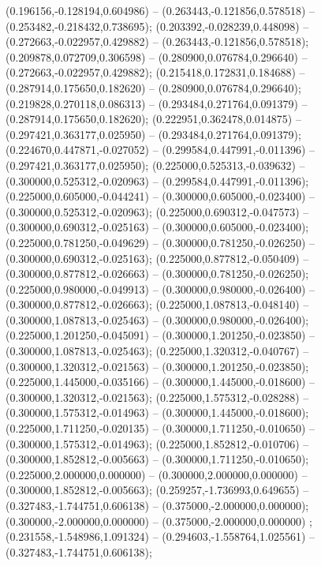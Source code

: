  (0.196156,-0.128194,0.604986) -- (0.263443,-0.121856,0.578518) -- (0.253482,-0.218432,0.738695);
 (0.203392,-0.028239,0.448098) -- (0.272663,-0.022957,0.429882) -- (0.263443,-0.121856,0.578518);
 (0.209878,0.072709,0.306598) -- (0.280900,0.076784,0.296640) -- (0.272663,-0.022957,0.429882);
 (0.215418,0.172831,0.184688) -- (0.287914,0.175650,0.182620) -- (0.280900,0.076784,0.296640);
 (0.219828,0.270118,0.086313) -- (0.293484,0.271764,0.091379) -- (0.287914,0.175650,0.182620);
 (0.222951,0.362478,0.014875) -- (0.297421,0.363177,0.025950) -- (0.293484,0.271764,0.091379);
 (0.224670,0.447871,-0.027052) -- (0.299584,0.447991,-0.011396) -- (0.297421,0.363177,0.025950);
 (0.225000,0.525313,-0.039632) -- (0.300000,0.525312,-0.020963) -- (0.299584,0.447991,-0.011396);
 (0.225000,0.605000,-0.044241) -- (0.300000,0.605000,-0.023400) -- (0.300000,0.525312,-0.020963);
 (0.225000,0.690312,-0.047573) -- (0.300000,0.690312,-0.025163) -- (0.300000,0.605000,-0.023400);
 (0.225000,0.781250,-0.049629) -- (0.300000,0.781250,-0.026250) -- (0.300000,0.690312,-0.025163);
 (0.225000,0.877812,-0.050409) -- (0.300000,0.877812,-0.026663) -- (0.300000,0.781250,-0.026250);
 (0.225000,0.980000,-0.049913) -- (0.300000,0.980000,-0.026400) -- (0.300000,0.877812,-0.026663);
 (0.225000,1.087813,-0.048140) -- (0.300000,1.087813,-0.025463) -- (0.300000,0.980000,-0.026400);
 (0.225000,1.201250,-0.045091) -- (0.300000,1.201250,-0.023850) -- (0.300000,1.087813,-0.025463);
 (0.225000,1.320312,-0.040767) -- (0.300000,1.320312,-0.021563) -- (0.300000,1.201250,-0.023850);
 (0.225000,1.445000,-0.035166) -- (0.300000,1.445000,-0.018600) -- (0.300000,1.320312,-0.021563);
 (0.225000,1.575312,-0.028288) -- (0.300000,1.575312,-0.014963) -- (0.300000,1.445000,-0.018600);
 (0.225000,1.711250,-0.020135) -- (0.300000,1.711250,-0.010650) -- (0.300000,1.575312,-0.014963);
 (0.225000,1.852812,-0.010706) -- (0.300000,1.852812,-0.005663) -- (0.300000,1.711250,-0.010650);
 (0.225000,2.000000,0.000000) -- (0.300000,2.000000,0.000000) -- (0.300000,1.852812,-0.005663);
 (0.259257,-1.736993,0.649655) -- (0.327483,-1.744751,0.606138) -- (0.375000,-2.000000,0.000000);
 (0.300000,-2.000000,0.000000) -- (0.375000,-2.000000,0.000000) ;
 (0.231558,-1.548986,1.091324) -- (0.294603,-1.558764,1.025561) -- (0.327483,-1.744751,0.606138);
